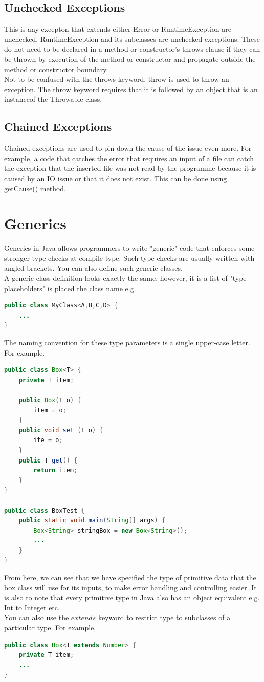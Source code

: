 \documentclass[11pt,a4 paper]{book}
\theoremstyle{plain}
\theoremstyle{definition}
\theoremstyle{remark}
\begin{document}
\begin{flushleft}
\subsection{Unchecked Exceptions}
This is any excepton that extends either Error or RuntimeException are unchecked. RuntimeException and its subclasses are unchecked exceptions. These do not need to be declared in a method or constructor's throws clause if they can be thrown by execution of the method or constructor and propagate outside the method or constructor boundary.\\
Not to be confused with the throws keyword, throw is used to throw an exception. The throw keyword requires that it is followed by an object that is an instanceof the Throwable class. 
\subsection{Chained Exceptions}
Chained exceptions are used to pin down the cause of the issue even more. For example, a code that catches the error that requires an input of a file can catch the exception that the inserted file was not read by the programme because it is caused by an IO issue or that it does not exist. This can be done using getCause() method.
\section{Generics}
Generics in Java allows programmers to write "generic" code that enforces some stronger type checks at compile type. Such type checks are usually written with angled brackets. You can also define such generic classes. \\
A generic class definition looks exactly the same, however, it is a list of "type placeholders" is placed the class name e.g.
\begin{lstlisting}[language = Java]
public class MyClass<A,B,C,D> {
	...
}
\end{lstlisting}
The naming convention for these type parameters is a single upper-case letter. For example.
\begin{lstlisting}[language = Java]
public class Box<T> {
	private T item;

	public Box(T o) {
		item = o;
	}
	public void set (T o) {
		ite = o;
	}
	public T get() {
		return item;
	}
}

public class BoxTest {
	public static void main(String[] args) {
		Box<String> stringBox = new Box<String>();
		...
	}
}
\end{lstlisting}
From here, we can see that we have specified the type of primitive data that the box class will use for its inputs, to make error handling and controlling easier. It is also to note that every primitive type in Java also has an object equivalent e.g. Int to Integer etc. \\
You can also use the $extends$ keyword to restrict type to subclasses of a particular type. For example,
\begin{lstlisting}[language = Java]
public class Box<T extends Number> {
	private T item;
	...
}
\end{lstlisting}

\end{flushleft}
\end{document}
